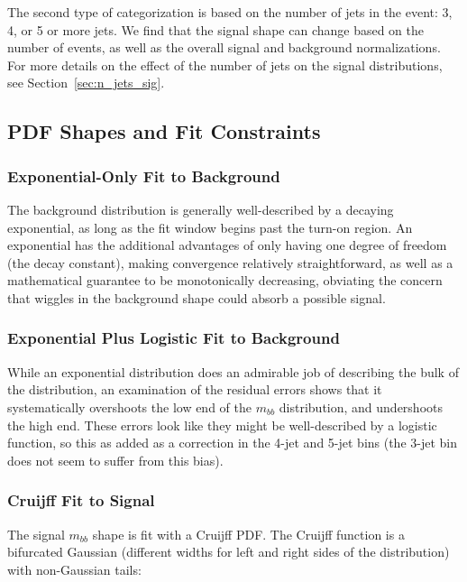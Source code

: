 The second type of categorization is based on the number of 
jets in the event: 3, 4, or 5 or more jets.  We find that the signal
shape can change based on the number of events, as well as the overall
signal and background normalizations.  For more details on the effect of 
the number of jets on the signal distributions, see Section~\ref{sec:n_jets_sig}. 




\subsection{PDF Shapes and Fit Constraints}
\label{sec:pdfs}

\subsubsection{Exponential-Only Fit to Background}
The background distribution is generally well-described by a decaying exponential, 
as long as the fit window begins past the turn-on region.  An exponential has the
additional advantages of only having one degree of freedom (the decay constant), 
making convergence relatively straightforward, as well as a mathematical guarantee
to be monotonically decreasing, obviating the concern that wiggles in the background
shape could absorb a possible signal.






\subsubsection{Exponential Plus Logistic Fit to Background}
While an exponential distribution does an admirable job of describing the bulk of the
distribution, an examination of the residual errors shows that it systematically 
overshoots the low end of the $m_{bb}$ distribution, and undershoots
the high end.  These errors look like they might be well-described by a logistic
function, so this as added as a correction in the 4-jet and 5-jet bins (the 3-jet
bin does not seem to suffer from this bias).  




\subsubsection{Cruijff Fit to Signal}

The signal $m_{bb}$ shape is fit with a Cruijff PDF.  The Cruijff function is a bifurcated Gaussian (different widths for left and right sides of the distribution) with non-Gaussian tails: 

